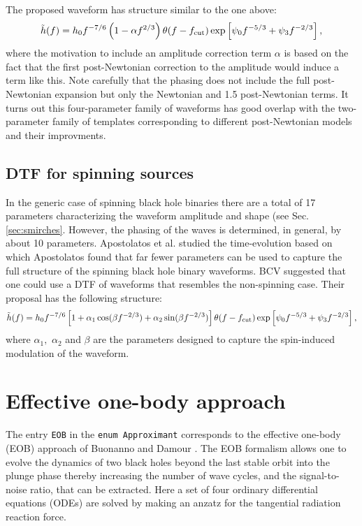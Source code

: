  The proposed waveform has structure similar to the one above:
 \begin{equation}
 \tilde h(f) = h_0 f^{-7/6} \left (1 - \alpha f^{2/3} \right) \theta(f-f_{\rm cut})
 \exp \left [ \psi_0 f^{-5/3} + \psi_3 f^{-2/3} \right ],
\label{eq:BCV:NonSpinning}
 \end{equation}
 where the motivation to include an amplitude correction term $\alpha$ is based on the
 fact that the first post-Newtonian correction to the amplitude would induce a term like this.
 Note carefully that the phasing does not include the full post-Newtonian expansion
 but only the Newtonian and 1.5 post-Newtonian terms. It turns out this four-parameter
 family of waveforms has good overlap with the two-parameter family of templates
 corresponding to different post-Newtonian models and their improvments.

\subsection{DTF for spinning sources}
In the generic case of spinning black hole binaries there are a total of 17
parameters characterizing the waveform amplitude and shape
(see Sec.\ref{sec:smirches}.  However, the phasing
of the waves is determined, in general, by about 10 parameters. Apostolatos
et al. \cite {ACST94} studied the time-evolution based on which Apostolatos
found \cite{TAA96} that far fewer parameters can be used to capture
the full structure of the spinning black hole binary
waveforms. BCV suggested \cite{BCV03b} that one could use a DTF of waveforms that resembles
the non-spinning case. Their proposal has the following structure:
\begin{equation}
\tilde h(f) = h_0 f^{-7/6}
\left [1 + \alpha_1 \cos ( \beta f^{-2/3} )
         + \alpha_2 \sin ( \beta f^{-2/3} ) \right]
\theta(f-f_{\rm cut})
 \exp \left [ \psi_0 f^{-5/3} + \psi_3 f^{-2/3} \right ],
\label{eq:BCV:Spinning}
\end{equation}
where $\alpha_1,$ $\alpha_2$ and $\beta$ are the parameters designed
to capture the spin-induced modulation of the waveform.

\section{Effective one-body approach}
\label{sec:EOB}
\newcommand{\ww}{\widehat{\omega}}
\newcommand{\wF}{\widehat{\cal F}}
The entry \texttt{EOB} in the {\tt enum Approximant} corresponds to the
effective one-body (EOB) approach of Buonanno and Damour
\cite{BD99,BD00,DJS00,TD02}. The EOB formalism allows one to evolve
the dynamics of two black holes beyond the last stable orbit into
the plunge phase thereby increasing the number of
wave cycles, and the signal-to-noise ratio, that can be extracted.
Here a set of four ordinary differential equations (ODEs) are solved
by making an anzatz for the tangential radiation reaction force.

